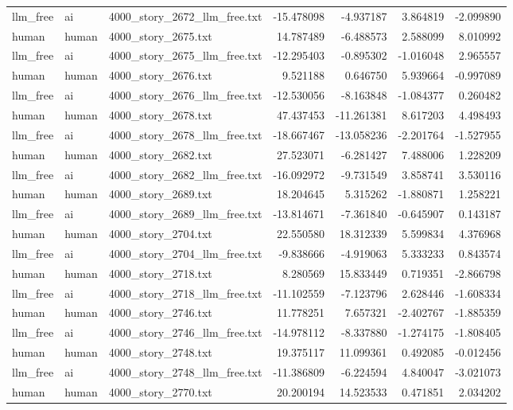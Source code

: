 \begin{longtable}{lllrrrr}
llm\_free & ai & 4000\_story\_2672\_llm\_free.txt & -15.478098 & -4.937187 & 3.864819 & -2.099890 \\
human & human & 4000\_story\_2675.txt & 14.787489 & -6.488573 & 2.588099 & 8.010992 \\
llm\_free & ai & 4000\_story\_2675\_llm\_free.txt & -12.295403 & -0.895302 & -1.016048 & 2.965557 \\
human & human & 4000\_story\_2676.txt & 9.521188 & 0.646750 & 5.939664 & -0.997089 \\
llm\_free & ai & 4000\_story\_2676\_llm\_free.txt & -12.530056 & -8.163848 & -1.084377 & 0.260482 \\
human & human & 4000\_story\_2678.txt & 47.437453 & -11.261381 & 8.617203 & 4.498493 \\
llm\_free & ai & 4000\_story\_2678\_llm\_free.txt & -18.667467 & -13.058236 & -2.201764 & -1.527955 \\
human & human & 4000\_story\_2682.txt & 27.523071 & -6.281427 & 7.488006 & 1.228209 \\
llm\_free & ai & 4000\_story\_2682\_llm\_free.txt & -16.092972 & -9.731549 & 3.858741 & 3.530116 \\
human & human & 4000\_story\_2689.txt & 18.204645 & 5.315262 & -1.880871 & 1.258221 \\
llm\_free & ai & 4000\_story\_2689\_llm\_free.txt & -13.814671 & -7.361840 & -0.645907 & 0.143187 \\
human & human & 4000\_story\_2704.txt & 22.550580 & 18.312339 & 5.599834 & 4.376968 \\
llm\_free & ai & 4000\_story\_2704\_llm\_free.txt & -9.838666 & -4.919063 & 5.333233 & 0.843574 \\
human & human & 4000\_story\_2718.txt & 8.280569 & 15.833449 & 0.719351 & -2.866798 \\
llm\_free & ai & 4000\_story\_2718\_llm\_free.txt & -11.102559 & -7.123796 & 2.628446 & -1.608334 \\
human & human & 4000\_story\_2746.txt & 11.778251 & 7.657321 & -2.402767 & -1.885359 \\
llm\_free & ai & 4000\_story\_2746\_llm\_free.txt & -14.978112 & -8.337880 & -1.274175 & -1.808405 \\
human & human & 4000\_story\_2748.txt & 19.375117 & 11.099361 & 0.492085 & -0.012456 \\
llm\_free & ai & 4000\_story\_2748\_llm\_free.txt & -11.386809 & -6.224594 & 4.840047 & -3.021073 \\
human & human & 4000\_story\_2770.txt & 20.200194 & 14.523533 & 0.471851 & 2.034202 \\

\end{longtable}

